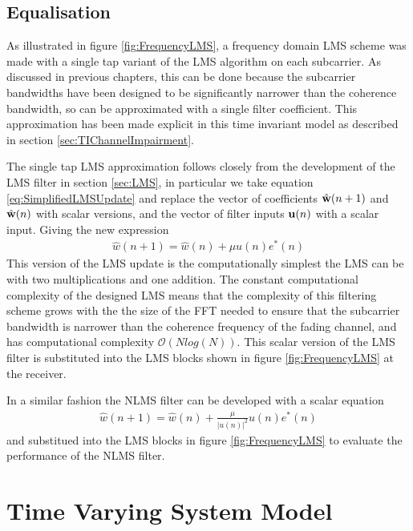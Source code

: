 \subsection{Equalisation}

As illustrated in figure \ref{fig:FrequencyLMS}, a frequency domain %
LMS scheme was made with a single tap variant of the LMS algorithm on %
each subcarrier. As discussed in previous chapters, this can be done %
because the subcarrier bandwidths have been designed to be significantly %
narrower than the coherence bandwidth, so can be approximated with a %
single filter coefficient. This approximation has been made explicit in this %
time invariant model as described in section \ref{sec:TIChannelImpairment}. %

The single tap LMS approximation follows closely from the development of the %
LMS filter in section \ref{sec:LMS}, in particular we take equation \ref{eq:SimplifiedLMSUpdate} %
and replace the vector of coefficients $\hat{\bold{w}}(n+1)$ and $\hat{\bold{w}}(n)$ with scalar %
versions, and the vector of filter inputs $\bold{u}(n)$ with a scalar input. Giving the %
new expression
\begin{align}
	\hat{w}(n+1) = \hat{w}(n) + \mu u(n) e^{*}(n)
	\label{eq:ScalarLMS}
\end{align}
This version of the LMS update is the computationally simplest %
the LMS can be with two multiplications and one addition. %
The constant computational complexity of the designed LMS means %
that the complexity of this filtering scheme grows with the %
the size of the FFT needed to ensure that the subcarrier bandwidth %
is narrower than the coherence frequency of the fading channel, and %
has computational complexity $\mathcal{O}(N log(N))$. This scalar version %
of the LMS filter is substituted into the LMS blocks shown in figure %
\ref{fig:FrequencyLMS} at the receiver.

In a similar fashion the NLMS filter can be developed with a scalar equation %
\begin{align}
	\hat{w}(n+1) = \hat{w}(n) + \frac{\mu}{\lvert u(n) \rvert^{2}} %
	u(n) e^{*}(n)
	\label{eq:ScalarNLMS}
\end{align}
and substitued into the LMS blocks in figure \ref{fig:FrequencyLMS} to %
evaluate the performance of the NLMS filter.

\section{Time Varying System Model}

